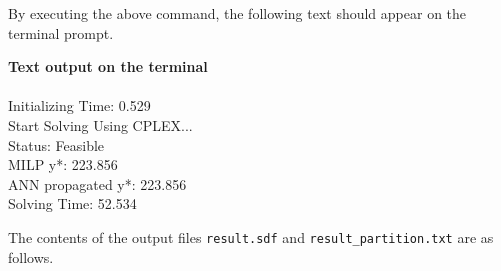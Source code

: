 \documentclass[11pt,titlepage,dvipdfmx,twoside]{book}
\begin{document}
By executing the above command, the following text should appear on the terminal prompt.

\bigskip

\begin{oframed}
{\bf Text output on the terminal}\\\\
 Initializing Time: 0.529  \\
Start Solving Using CPLEX...\\
Status: Feasible 		\\
MILP y*: 223.856 		\\
ANN propagated y*: 223.856 \\
Solving Time: 52.534       
\end{oframed}

The contents of the output files {\tt result.sdf} and
{\tt result\_partition.txt} are as follows.

\bigskip
\end{document}
